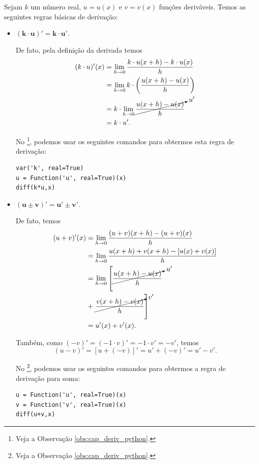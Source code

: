 Sejam $k$ um número real, $u = u(x)$ e $v = v(x)$ funções deriváveis. Temos as seguintes regras básicas de derivação:
\begin{itemize}
\item $\pmb{(k\cdot u)' = k\cdot u'}$.

  De fato, pela definição da derivada temos
  \begin{align}
    (k\cdot u)'(x) &= \lim_{h\to 0} \frac{k\cdot u(x+h)-k\cdot u(x)}{h} \\
                   &= \lim_{h\to 0} k\cdot \left(\frac{u(x+h)-u(x)}{h}\right) \\
                   &= k\cdot \lim_{h\to 0} \cancelto{u'}{\frac{u(x+h)-u(x)}{h}} \\
                   &= k\cdot u'.
  \end{align}
  
  \ifispython
  No \sympy\footnote{Veja a Observação \ref{obs:cap_deriv_python}.}, podemos usar os seguintes comandos para obtermos esta regra de derivação:
\begin{verbatim}
var('k', real=True)
u = Function('u', real=True)(x)
diff(k*u,x)
\end{verbatim}
  \fi

\item $\pmb{(u\pm v)' = u'\pm v'}$.

  De fato, temos
  \begin{align}
    (u + v)'(x) &= \lim_{h\to 0} \frac{(u + v)(x+h)-(u + v)(x)}{h}\\
                &= \lim_{h\to 0} \frac{u(x+h)+v(x+h)-[u(x)+v(x)]}{h}\\
                &= \lim_{h\to 0} \left[\cancelto{u'}{\frac{u(x+h)-u(x)}{h}} \right. \\
                &+ \left. \cancelto{v'}{\frac{v(x+h)-v(x)}{h}}\right]\\
                &= u'(x) + v'(x).
  \end{align}

  Também, como $(-v)' = (-1\cdot v)' = -1\cdot v' = -v'$, temos
  \begin{equation}
    (u-v)' = [u+(-v)]' = u' + (-v)' = u' - v'.
  \end{equation}
  
  \ifispython
  No \sympy\footnote{Veja a Observação \ref{obs:cap_deriv_python}.}, podemos usar os seguintes comandos para obtermos a regra de derivação para soma:
\begin{verbatim}
u = Function('u', real=True)(x)
v = Function('v', real=True)(x)
diff(u+v,x)
\end{verbatim}
  \fi
\end{itemize}

